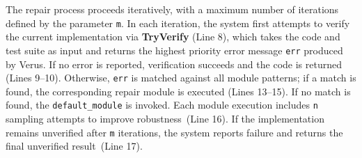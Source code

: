 
The repair process proceeds iteratively, with a maximum number of iterations defined by the parameter \texttt{m}. In each iteration, the system first attempts to verify the current implementation via \textbf{TryVerify} (Line 8), which takes the code and test suite as input and returns the highest priority error message \texttt{err} produced by Verus. If no error is reported, verification succeeds and the code is returned (Lines 9--10). Otherwise, \texttt{err} is matched against all module patterns; if a match is found, the corresponding repair module is executed (Lines 13--15). If no match is found, the \texttt{default\_module} is invoked. Each module execution includes {\tt n} sampling attempts to improve robustness~(Line 16). %
If the implementation remains unverified after \texttt{m} iterations, the system reports failure and returns the final unverified result~(Line 17).



